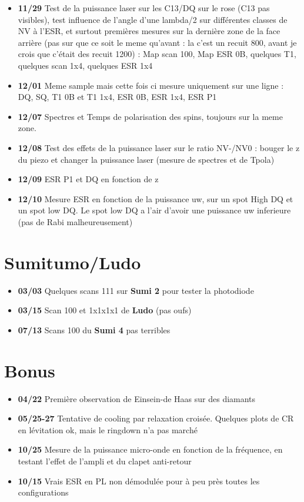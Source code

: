 \documentclass[a4paper]{article}
\begin{document}
\begin{itemize}
\item \textbf{11/29} Test de la puissance laser sur les C13/DQ sur le rose (C13 pas visibles), test influence de l'angle d'une lambda/2 sur différentes classes de NV à l'ESR, et surtout premières mesures sur la dernière zone de la face arrière (pas sur que ce soit le meme qu'avant : la c'est un recuit 800, avant je crois que c'était des recuit 1200) : Map scan 100, Map ESR 0B, quelques T1, quelques scan 1x4, quelques ESR 1x4
\item \textbf{12/01} Meme sample mais cette fois ci mesure uniquement sur une ligne : DQ, SQ, T1 0B et T1 1x4, ESR 0B, ESR 1x4, ESR P1
\item \textbf{12/07} Spectres et Temps de polarisation des spins, toujours sur la meme zone.
\item \textbf{12/08} Test des effets de la puissance laser sur le ratio NV-/NV0 : bouger le z du piezo et changer la puissance laser (mesure de spectres et de Tpola)
\item \textbf{12/09} ESR P1 et DQ en fonction de z
\item \textbf{12/10} Mesure ESR en fonction de la puissance uw, sur un spot High DQ et un spot low DQ. Le spot low DQ a l'air d'avoir une puissance uw inferieure (pas de Rabi malheureusement)
\end{itemize}

\section{Sumitumo/Ludo}
\begin{itemize}
\item \textbf{03/03} Quelques scans 111 sur \textbf{Sumi 2} pour tester la photodiode
\item \textbf{03/15} Scan 100 et 1x1x1x1 de \textbf{Ludo} (pas oufs)
\item \textbf{07/13} Scans 100 du \textbf{Sumi 4} pas terribles
\end{itemize}

\section{Bonus}
\begin{itemize}
\item \textbf{04/22} Première observation de Einsein-de Haas sur des diamants
\item \textbf{05/25-27} Tentative de cooling par relaxation croisée. Quelques plots de CR en lévitation ok, mais le ringdown n'a pas marché
\item \textbf{10/25} Mesure de la puissance micro-onde en fonction de la fréquence, en testant l'effet de l'ampli et du clapet anti-retour
\item \textbf{10/15} Vrais ESR en PL non démodulée pour à peu près toutes les configurations


\end{itemize}
\end{document}

